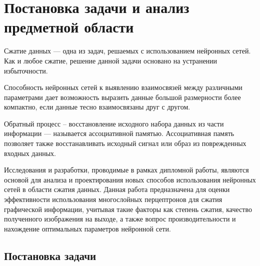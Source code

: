 \section{Постановка задачи и анализ предметной области}
\label{sec:practice:planning}

Сжатие данных --- одна из задач, решаемых с использованием нейронных сетей.
Как и любое сжатие, решение данной задачи основано на устранении избыточности.

Способность нейронных сетей к выявлению взаимосвязей между различными параметрами дает возможность выразить данные большой размерности более компактно, если данные тесно взаимосвязаны друг с другом.

Обратный процесс – восстановление исходного набора данных из части информации --- называется ассоциативной памятью.
Ассоциативная память позволяет также восстанавливать исходный сигнал или образ из поврежденных входных данных.

Исследования и разработки, проводимые в рамках дипломной работы, являются основой для анализа и проектирования новых способов использования нейронных сетей в области сжатия данных.
Данная работа предназначена для оценки эффективности использования многослойных перцептронов для сжатия графической информации,
учитывая такие факторы как степень сжатия, качество полученного изображения на выходе,
а также вопрос производительности и нахождение оптимальных параметров нейронной сети.


\subsection{Постановка задачи}
\label{sub:practice:task_planning}

